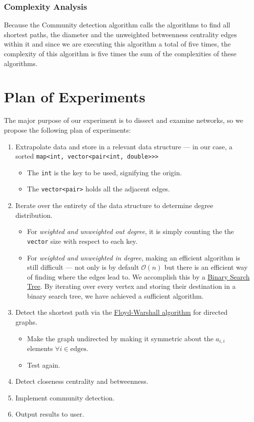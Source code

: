 \documentclass{article}
\begin{document}
\subsubsection{Complexity Analysis}
Because the Community detection algorithm calls the algorithms to find all shortest paths, the diameter and the unweighted betweenness centrality edges within it and since we are executing this algorithm a total of five times, the complexity of this algorithm is five times the sum of the complexities of these algorithms.

\section{Plan of Experiments}
The major purpose of our experiment is to dissect and examine networks, so we propose the following plan of experiments:

\begin{enumerate}
    \item Extrapolate data and store in a relevant data structure --- in our case, a sorted \texttt{map<int, vector<pair<int, double>>>}
    \begin{itemize}
        \item The \texttt{int} is the key to be used, signifying the origin.
        \item The \texttt{vector<pair>} holds all the adjacent edges.
    \end{itemize}
    \item Iterate over the entirety of the data structure to determine degree distribution.
    \begin{itemize}
        \item For \emph{weighted and unweighted out degree}, it is simply counting the the \texttt{vector} size with respect to each key.
        \item For \emph{weighted and unweighted in degree}, making an efficient algorithm is still difficult --- not only is by default $\mathcal{O}(n)$ but there is an efficient way of finding where the edges lead to. We accomplish this by a \href{https://en.wikipedia.org/wiki/Binary_search_tree}{Binary Search Tree}. By iterating over every vertex and storing their destination in a binary search tree, we have achieved a sufficient algorithm.
    \end{itemize}
    \item Detect the shortest path via the \href{https://en.wikipedia.org/wiki/Floyd–Warshall_algorithm}{Floyd-Warshall algorithm} for directed graphs.
        \begin{itemize}
            \item Make the graph undirected by making it symmetric about the $a _{i, i}$ elements $\forall i \in \text{edges}$.
            \item Test again.
        \end{itemize}
    \item Detect closeness centrality and betweenness.
    \item Implement community detection.
    \item Output results to user.
\end{enumerate}
\end{document}
